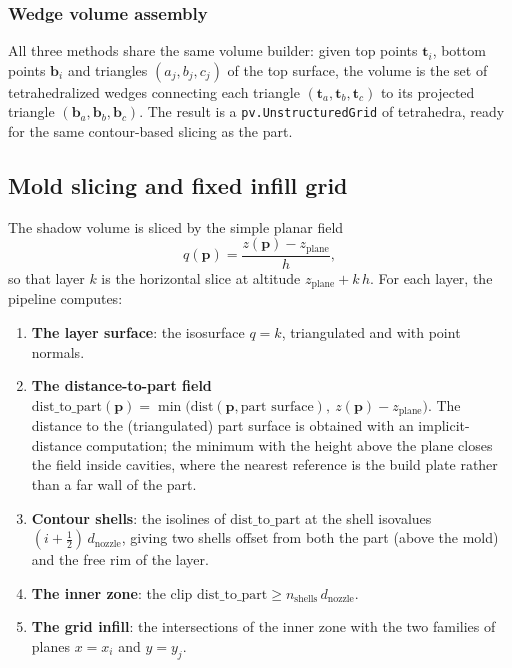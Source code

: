 \subsubsection{Wedge volume assembly}

All three methods share the same volume builder: given top points
$\mathbf{t}_i$, bottom points $\mathbf{b}_i$ and triangles
$(a_j, b_j, c_j)$ of the top surface, the volume is the set of
tetrahedralized wedges connecting each triangle
$(\mathbf{t}_{a}, \mathbf{t}_{b}, \mathbf{t}_{c})$ to its projected
triangle $(\mathbf{b}_{a}, \mathbf{b}_{b}, \mathbf{b}_{c})$. The
result is a \texttt{pv.UnstructuredGrid} of tetrahedra, ready for the
same contour-based slicing as the part.

\subsection{Mold slicing and fixed infill grid}\label{sec:meth-moldslice}

The shadow volume is sliced by the simple planar field
\begin{equation}
  q(\mathbf{p}) = \frac{z(\mathbf{p}) - z_{\mathrm{plane}}}{h},
\end{equation}
so that layer $k$ is the horizontal slice at altitude
$z_{\mathrm{plane}} + k\,h$. For each layer, the pipeline computes:

\begin{enumerate}
  \item \textbf{The layer surface}: the isosurface $q = k$, triangulated
        and with point normals.
  \item \textbf{The distance-to-part field}
        $\mathrm{dist\_to\_part}(\mathbf{p}) = \min\!\big(
        \mathrm{dist}(\mathbf{p}, \text{part surface}),
        \ z(\mathbf{p}) - z_{\mathrm{plane}} \big)$.
        The distance to the (triangulated) part surface is obtained
        with an implicit-distance computation; the minimum with the
        height above the plane closes the field inside cavities, where
        the nearest reference is the build plate rather than a far
        wall of the part.
  \item \textbf{Contour shells}: the isolines of
        $\mathrm{dist\_to\_part}$ at the shell isovalues
        $(i + \tfrac12)\, d_{\mathrm{nozzle}}$, giving two shells
        offset from both the part (above the mold) and the free rim
        of the layer.
  \item \textbf{The inner zone}: the clip
        $\mathrm{dist\_to\_part} \ge n_{\mathrm{shells}}\,
        d_{\mathrm{nozzle}}$.
  \item \textbf{The grid infill}: the intersections of the inner zone
        with the two families of planes $x = x_i$ and $y = y_j$.
\end{enumerate}


